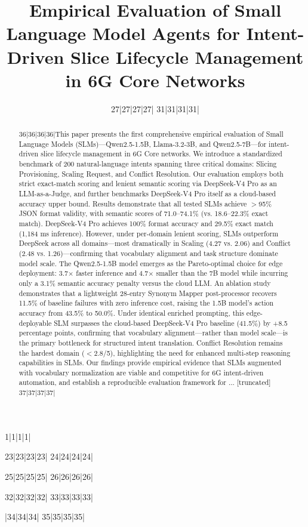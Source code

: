 1|1|1|1|\documentclass[10pt,conference]{IEEEtran}
\begin{document}
23|23|23|23|
24|24|24|24|\title{Empirical Evaluation of Small Language Model Agents for Intent-Driven Slice Lifecycle Management in 6G Core Networks}
25|25|25|25|
26|26|26|26|\author{
27|27|27|27|
31|31|31|31|}
32|32|32|32|
33|33|33|33||34|34|34|
35|35|35|35|\begin{abstract}
36|36|36|36|This paper presents the first comprehensive empirical evaluation of Small Language Models (SLMs)---Qwen2.5-1.5B, Llama-3.2-3B, and Qwen2.5-7B---for intent-driven slice lifecycle management in 6G Core networks. We introduce a standardized benchmark of 200 natural-language intents spanning three critical domains: Slicing Provisioning, Scaling Request, and Conflict Resolution. Our evaluation employs both strict exact-match scoring and lenient semantic scoring via DeepSeek-V4 Pro as an LLM-as-a-Judge, and further benchmarks DeepSeek-V4 Pro itself as a cloud-based accuracy upper bound. Results demonstrate that all tested SLMs achieve $>$95\% JSON format validity, with semantic scores of 71.0--74.1\% (vs. 18.6--22.3\% exact match). DeepSeek-V4 Pro achieves 100\% format accuracy and 29.5\% exact match (1,184 ms inference). However, under per-domain lenient scoring, SLMs outperform DeepSeek across all domains---most dramatically in Scaling (4.27 vs. 2.06) and Conflict (2.48 vs. 1.26)---confirming that vocabulary alignment and task structure dominate model scale. The Qwen2.5-1.5B model emerges as the Pareto-optimal choice for edge deployment: 3.7$\times$ faster inference and 4.7$\times$ smaller than the 7B model while incurring only a 3.1\% semantic accuracy penalty versus the cloud LLM. An ablation study demonstrates that a lightweight 28-entry Synonym Mapper post-processor recovers 11.5\% of baseline failures with zero inference cost, raising the 1.5B model's action accuracy from 43.5\% to 50.0\%. Under identical enriched prompting, this edge-deployable SLM surpasses the cloud-based DeepSeek-V4 Pro baseline (41.5\%) by +8.5 percentage points, confirming that vocabulary alignment---rather than model scale---is the primary bottleneck for structured intent translation. Conflict Resolution remains the hardest domain ($<$2.8/5), highlighting the need for enhanced multi-step reasoning capabilities in SLMs. Our findings provide empirical evidence that SLMs augmented with vocabulary normalization are viable and competitive for 6G intent-driven automation, and establish a reproducible evaluation framework for ... [truncated]
37|37|37|37|\end{abstract}
\end{document}
